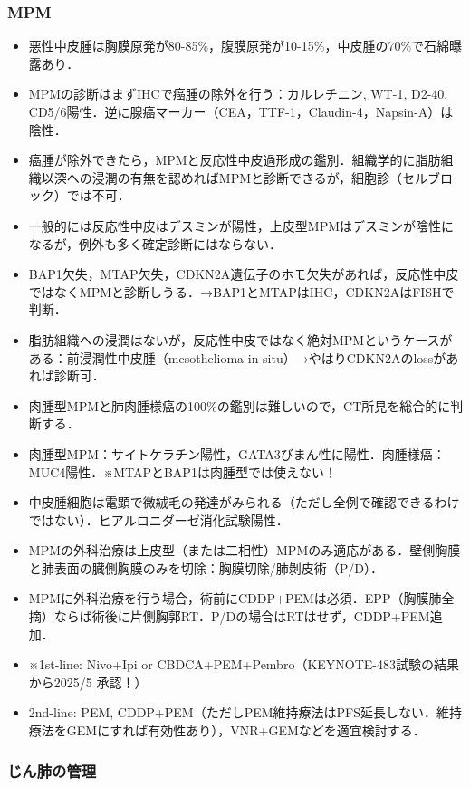 \subsubsection{MPM}

\begin{itemize}
\item 悪性中皮腫は胸膜原発が80-85\%，腹膜原発が10-15\%，中皮腫の70\%で石綿曝露あり．
\item MPMの診断はまずIHCで癌腫の除外を行う：カルレチニン, WT-1, D2-40, CD5/6陽性．逆に腺癌マーカー（CEA，TTF-1，Claudin-4，Napsin-A）は陰性．
\item 癌腫が除外できたら，MPMと反応性中皮過形成の鑑別．組織学的に脂肪組織以深への浸潤の有無を認めればMPMと診断できるが，細胞診（セルブロック）では不可．
\item 一般的には反応性中皮はデスミンが陽性，上皮型MPMはデスミンが陰性になるが，例外も多く確定診断にはならない．
\item BAP1欠失，MTAP欠失，CDKN2A遺伝子のホモ欠失があれば，反応性中皮ではなくMPMと診断しうる．→BAP1とMTAPはIHC，CDKN2AはFISHで判断．
\item 脂肪組織への浸潤はないが，反応性中皮ではなく絶対MPMというケースがある：前浸潤性中皮腫（mesothelioma in situ）→やはりCDKN2Aのlossがあれば診断可．
\item 肉腫型MPMと肺肉腫様癌の100\%の鑑別は難しいので，CT所見を総合的に判断する．
\item 肉腫型MPM：サイトケラチン陽性，GATA3びまん性に陽性．肉腫様癌：MUC4陽性．※MTAPとBAP1は肉腫型では使えない！
\item 中皮腫細胞は電顕で微絨毛の発達がみられる（ただし全例で確認できるわけではない）．ヒアルロニダーゼ消化試験陽性．
\item MPMの外科治療は上皮型（または二相性）MPMのみ適応がある．壁側胸膜と肺表面の臓側胸膜のみを切除：胸膜切除/肺剝皮術（P/D）．
\item MPMに外科治療を行う場合，術前にCDDP+PEMは必須．EPP（胸膜肺全摘）ならば術後に片側胸郭RT．P/Dの場合はRTはせず，CDDP+PEM追加．
\item ※1st-line: Nivo+Ipi or CBDCA+PEM+Pembro（KEYNOTE-483試験の結果から2025/5 承認！）
\item 2nd-line: PEM, CDDP+PEM（ただしPEM維持療法はPFS延長しない．維持療法をGEMにすれば有効性あり），VNR+GEMなどを適宜検討する．
\end{itemize}


\subsubsection{じん肺の管理}

